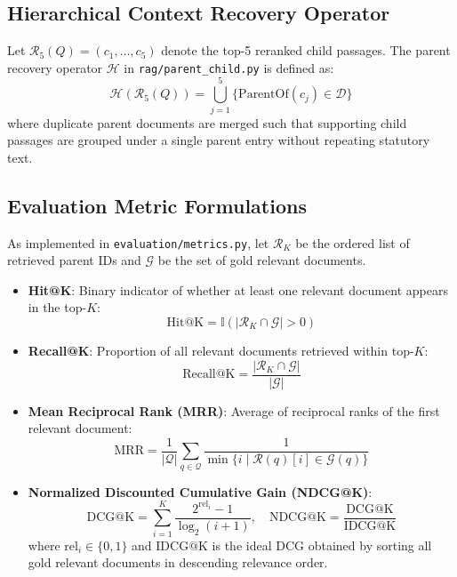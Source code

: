 \documentclass[10pt,twocolumn]{article}
\begin{document}
\subsection{Hierarchical Context Recovery Operator}
Let $\mathcal{R}_5(Q) = (c_1, \dots, c_5)$ denote the top-5 reranked child passages. The parent recovery operator $\mathcal{H}$ in \texttt{rag/parent\_child.py} is defined as:
\begin{equation}
\mathcal{H}(\mathcal{R}_5(Q)) = \bigcup_{j=1}^5 \Big\{ \text{ParentOf}(c_j) \in \mathcal{D} \Big\}
\end{equation}
where duplicate parent documents are merged such that supporting child passages are grouped under a single parent entry without repeating statutory text.

\subsection{Evaluation Metric Formulations}
As implemented in \texttt{evaluation/metrics.py}, let $\mathcal{R}_K$ be the ordered list of retrieved parent IDs and $\mathcal{G}$ be the set of gold relevant documents.
\begin{itemize}[leftmargin=*]
    \item \textbf{Hit@K}: Binary indicator of whether at least one relevant document appears in the top-$K$:
    \begin{equation}
    \text{Hit@K} = \mathbb{I}\left( \left|\mathcal{R}_K \cap \mathcal{G}\right| > 0 \right)
    \end{equation}
    \item \textbf{Recall@K}: Proportion of all relevant documents retrieved within top-$K$:
    \begin{equation}
    \text{Recall@K} = \frac{\left|\mathcal{R}_K \cap \mathcal{G}\right|}{|\mathcal{G}|}
    \end{equation}
    \item \textbf{Mean Reciprocal Rank (MRR)}: Average of reciprocal ranks of the first relevant document:
    \begin{equation}
    \text{MRR} = \frac{1}{|\mathcal{Q}|} \sum_{q \in \mathcal{Q}} \frac{1}{\min \{i \mid \mathcal{R}(q)[i] \in \mathcal{G}(q)\}}
    \end{equation}
    \item \textbf{Normalized Discounted Cumulative Gain (NDCG@K)}:
    \begin{equation}
    \text{DCG@K} = \sum_{i=1}^K \frac{2^{\text{rel}_i} - 1}{\log_2(i + 1)}, \quad \text{NDCG@K} = \frac{\text{DCG@K}}{\text{IDCG@K}}
    \end{equation}
    where $\text{rel}_i \in \{0, 1\}$ and $\text{IDCG@K}$ is the ideal DCG obtained by sorting all gold relevant documents in descending relevance order.
\end{itemize}
\end{document}
